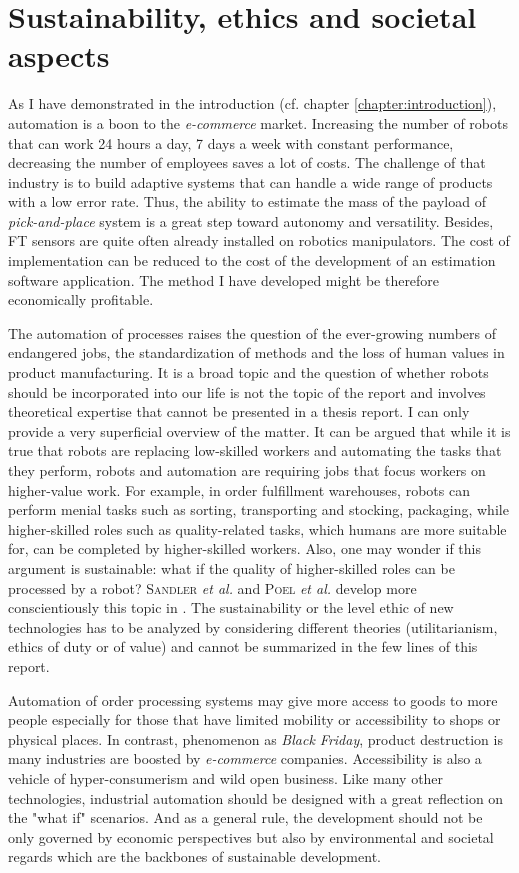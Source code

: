 \documentclass[/home/francois/latex/report/main.tex]{subfiles}
\begin{document}
\section{Sustainability, ethics and societal aspects}

As I have demonstrated in the introduction (cf. chapter \ref{chapter:introduction}), automation is a boon to the \textit{e-commerce} market. Increasing the number of robots that can work 24 hours a day, 7 days a week with constant performance, decreasing the number of employees saves a lot of costs. The challenge of that industry is to build adaptive systems that can handle a wide range of products with a low error rate. Thus, the ability to estimate the mass of the payload of \textit{pick-and-place} system is a great step toward autonomy and versatility. Besides, \ac{FT} sensors are quite often already installed on robotics manipulators. The cost of implementation can be reduced to the cost of the development of an estimation software application. The method I have developed might be therefore economically profitable.

The automation of processes raises the question of the ever-growing numbers of endangered jobs, the standardization of methods and the loss of human values in product manufacturing. It is a broad topic and the question of whether robots should be incorporated into our life is not the topic of the report and involves theoretical expertise that cannot be presented in a thesis report. I can only provide a very superficial overview of the matter. It can be argued that while it is true that robots are replacing low-skilled workers and automating the tasks that they perform, robots and automation are requiring jobs that focus workers on higher-value work. For example, in order fulfillment warehouses, robots can perform menial tasks such as sorting, transporting and stocking, packaging, while higher-skilled roles such as quality-related tasks, which humans are more suitable for, can be completed by higher-skilled workers. Also, one may wonder if this argument is sustainable: what if the quality of higher-skilled roles can be processed by a robot? \textsc{Sandler} \textit{et al.} and \textsc{Poel} \textit{et al.} develop more conscientiously this topic in \cite{Sandler2014, Poel2011}. The sustainability or the level ethic of new technologies has to be analyzed by considering different theories (utilitarianism, ethics of duty or of value) and cannot be summarized in the few lines of this report.

Automation of order processing systems may give more access to goods to more people especially for those that have limited mobility or accessibility to shops or physical places. In contrast, phenomenon as \textit{Black Friday}, product destruction is many industries are boosted by \textit{e-commerce} companies. Accessibility is also a vehicle of hyper-consumerism and wild open business. Like many other technologies, industrial automation should be designed with a great reflection on the "what if" scenarios. And as a general rule, the development should not be only governed by economic perspectives but also by environmental and societal regards which are the backbones of sustainable development.
\end{document}
